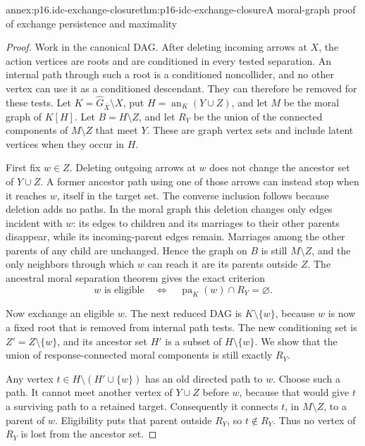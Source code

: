 \begin{annexitem}{annex:p16.idc-exchange-closure}{thm:p16-idc-exchange-closure}{A moral-graph proof of exchange persistence and maximality}
\begin{proof}
Work in the canonical DAG. After deleting incoming arrows at \(X\),
the action vertices are roots and are conditioned in every tested
separation. An internal path through such a root is a conditioned
noncollider, and no other vertex can use it as a conditioned
descendant. They can therefore be removed for these tests. Let
\(K=\widehat G_{\overline X}\setminus X\), put
\(H=\operatorname{an}_K(Y\cup Z)\), and let \(M\) be
the moral graph of \(K[H]\). Let \(B=H\setminus Z\),
and let \(R_Y\) be the union of the connected components of
\(M\setminus Z\) that meet \(Y\). These are graph vertex
sets and include latent vertices when they occur in \(H\).

First fix \(w\in Z\). Deleting outgoing arrows at \(w\)
does not change the ancestor set of \(Y\cup Z\). A former
ancestor path using one of those arrows can instead stop when
it reaches \(w\), itself in the target set. The converse
inclusion follows because deletion adds no paths. In the moral
graph this deletion changes only edges incident with \(w\):
its edges to children and its marriages to their other parents
disappear, while its incoming-parent edges remain. Marriages
among the other parents of any child are unchanged. Hence the
graph on \(B\) is still \(M\setminus Z\), and the only
neighbors through which \(w\) can reach it are its parents
outside \(Z\). The ancestral moral separation theorem gives
the exact criterion
\[
 w\text{ is eligible}\quad\Longleftrightarrow\quad
 \operatorname{pa}_K(w)\cap R_Y=\varnothing.
\]

Now exchange an eligible \(w\). The next reduced DAG is
\(K\setminus\{w\}\), because \(w\) is now a fixed
root that is removed from internal path tests. The new conditioning
set is \(Z'=Z\setminus\{w\}\), and its ancestor set
\(H'\) is a subset of \(H\setminus\{w\}\).
We show that the union of response-connected moral components is
still exactly \(R_Y\).

Any vertex \(t\in H\setminus(H'\cup\{w\})\) has an
old directed path to \(w\). Choose such a path. It cannot
meet another vertex of \(Y\cup Z\) before \(w\), because
that would give \(t\) a surviving path to a retained target.
Consequently it connects \(t\), in \(M\setminus Z\), to
a parent of \(w\). Eligibility puts that parent outside
\(R_Y\), so \(t\notin R_Y\). Thus no vertex of \(R_Y\)
is lost from the ancestor set.


\end{proof}
\end{annexitem}
